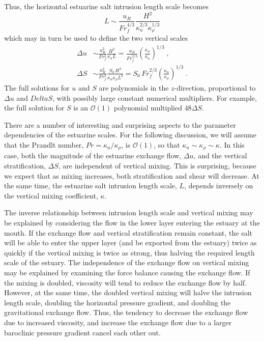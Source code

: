 \documentclass[11pt]{report}
\numberwithin{equation}{section}
\begin{document}
Thus, the horizontal estuarine salt intrusion length scale becomes
\begin{equation}
    L \sim \frac{u_R}{Fr_f^{4/3}} \frac{H^2}{\kappa_u^{2/3} \kappa_\rho^{1/3}}
\end{equation}
which may in turn be used to define the two vertical scales
\begin{align}
    \Delta u &\sim \frac{u_R^2}{Fr_f^2}\frac{H^2}{\kappa_u L} 
         = \frac{u_R}{Fr_f^{2/3}} \left( \frac{\kappa_\rho}{\kappa_u} \right)^{1/3} \; ,\\
    \Delta S &\sim \frac{u_R^2}{Fr_f^2}\frac{S_0\,H^4}{\kappa_u \kappa_\rho L^2} 
         =  S_0\,Fr_f^{2/3} \left( \frac{\kappa_u}{\kappa_\rho} \right)^{1/3} \; .
\end{align}
The full solutions for $u$ and $S$ are polynomials in the $z$-direction, proportional to $\Delta u$ and $Delta S$, with possibly large constant numerical multipliers.  For example, the full solution for $S$ is an $\mathcal{O}(1)$ polynomial multiplied $48 \Delta S$.  

There are a number of interesting and surprising aspects to the parameter dependencies of the estuarine scales.  For the following discussion, we will assume that the Prandlt number, $Pr = \kappa_u / \kappa_\rho$, is $\mathcal{O}(1)$, so that $\kappa_u \sim \kappa_\rho \sim \kappa$.  In this case, both the magnitude of the estuarine exchange flow, $\Delta u$, and the vertical stratification, $\Delta S$, are independent of vertical mixing.  This is surprising, because we expect that as mixing increases, both stratification and shear will decrease.  At the same time, the estuarine salt intrusion length scale, $L$, depends inversely on the vertical mixing coefficient, $\kappa$.

The inverse relationship between intrusion length scale and vertical mixing may be explained by considering the flow in the lower layer entering the estuary at the mouth.  If the exchange flow and vertical stratification remain constant, the salt will be able to enter the upper layer (and be exported from the estuary) twice as quickly if the vertical mixing is twice as strong, thus halving the required length scale of the estuary.  The independence of the exchange flow on vertical mixing may be explained by examining the force balance causing the exchange flow.  If the mixing is doubled, viscosity will tend to reduce the exchange flow by half.  However, at the same time, the doubled vertical mixing will halve the intrusion length scale, doubling the horizontal pressure gradient, and doubling the gravitational exchange flow.  Thus, the tendency to decrease the exchange flow due to increased viscosity, and increase the exchange flow due to a larger baroclinic pressure gradient cancel each other out.
\end{document}
